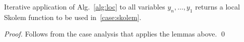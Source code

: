 \begin{theorem}[Soundness]
Iterative application of Alg.~\ref{alg:loc} to all variables $y_n,\ldots,y_1$ returns a local Skolem function to be used in~\eqref{case:skolem}.
\end{theorem}
\begin{proof}
Follows from the case analysis that applies the lemmas above.
\qed
\end{proof}


